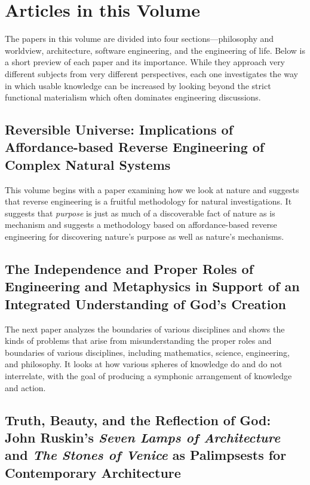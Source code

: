 \section{Articles in this Volume}

The papers in this volume are divided into four sections---philosophy and worldview, architecture, software engineering, and the engineering of life.  Below is a short preview of each paper and its importance.  While they
approach very different subjects from very different perspectives, each one investigates the way in which usable knowledge can be increased by looking beyond the strict functional materialism which often dominates engineering discussions.

\subsection*{Reversible Universe: Implications of Affordance-based Reverse Engineering of Complex Natural Systems}

This volume begins with a paper examining how we look at nature and suggests that reverse engineering is a fruitful methodology for natural investigations.  It suggests that \emph{purpose} is just as much of a discoverable fact of nature as is mechanism and suggests a methodology based on affordance-based reverse engineering for discovering nature's purpose as well as nature's mechanisms.  

\subsection*{The Independence and Proper Roles of Engineering and Metaphysics in Support of an Integrated Understanding of God's Creation}

The next paper analyzes the boundaries of various disciplines and shows the kinds of problems that arise from misunderstanding the proper roles and boundaries of various disciplines, including mathematics, science, engineering, and philosophy.  It looks at how various spheres of knowledge do and do not interrelate, with the goal of producing a symphonic arrangement of knowledge and action.

\subsection*{Truth, Beauty, and the Reflection of God: John Ruskin's \textit{Seven Lamps of Architecture} and \textit{The Stones of Venice} as Palimpsests for Contemporary Architecture}

